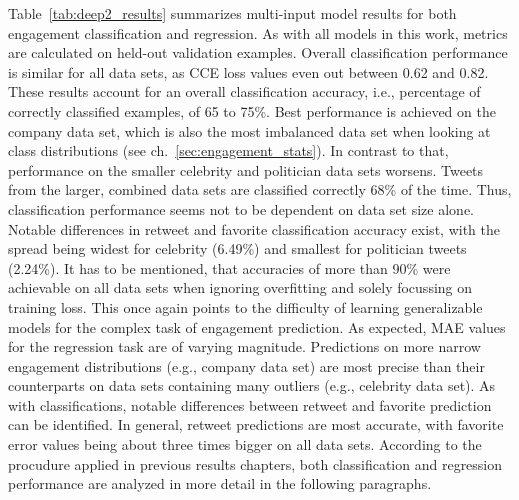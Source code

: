Table~\ref{tab:deep2_results} summarizes multi-input model results for both
engagement classification and regression.
As with all models in this work, metrics are calculated on held-out validation
examples.
Overall classification performance is similar for all data sets, as CCE loss values
even out between 0.62 and 0.82.
These results account for an overall classification accuracy, i.e., percentage
of correctly classified examples, of 65 to 75\%.
Best performance is achieved on the company data set, which is also the most
imbalanced data set when looking at class distributions (see ch.~\ref{sec:engagement_stats}).
In contrast to that, performance on the smaller celebrity and politician data sets
worsens.
Tweets from the larger, combined data sets are classified correctly 68\% of the
time.
Thus, classification performance seems not to be dependent on data set size alone.
Notable differences in retweet and favorite classification accuracy exist,
with the spread being widest for celebrity (6.49\%) and smallest for
politician tweets (2.24\%).
It has to be mentioned, that accuracies of more than 90\% were achievable on all
data sets when ignoring overfitting and solely focussing on training loss.
This once again points to the difficulty of learning generalizable models for
the complex task of engagement prediction.
As expected, MAE values for the regression task are of varying magnitude.
Predictions on more narrow engagement distributions (e.g., company data set)
are most precise than their counterparts on data sets containing many outliers
(e.g., celebrity data set).
As with classifications, notable differences between retweet and favorite prediction
can be identified.
In general, retweet predictions are most accurate, with favorite error values
being about three times bigger on all data sets.
According to the procudure applied in previous results chapters, both classification
and regression performance are analyzed in more detail in the following paragraphs.

